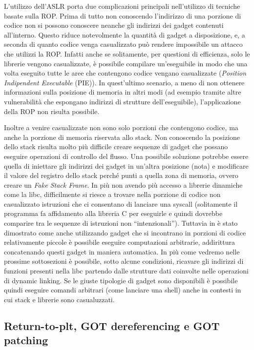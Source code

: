 L'utilizzo dell'ASLR porta due complicazioni principali nell'utilizzo
di tecniche basate sulla ROP. Prima di tutto non conoscendo
l'indirizzo di una porzione di codice non si possono conoscere neanche
gli indirizzi dei gadget contenuti all'interno. Questo riduce
notevolmente la quantità di gadget a disposizione, e, a seconda di
quanto codice venga casualizzato può rendere impossibile un attacco
che utilizzi la ROP. Infatti anche se solitamente, per questioni di
efficienza, solo le librerie vengono casualizzate, è possibile
compilare un'eseguibile in modo che una volta eseguito tutte le aree
che contengono codice vengano casualizzate (\emph{Position Indipendent
  Executable} (PIE)). In quest'ultimo scenario, a meno di non ottenere
informazioni sulla posizione di memoria in altri modi (ad esempio
tramite altre vulnerabilità che espongano indirizzi di strutture
dell'eseguibile), l'applicazione della ROP non risulta possibile.

Inoltre a venire casualizzate non sono solo porzioni che contengono
codice, ma anche la porzione di memoria riservata allo stack. Non
conoscendo la posizione dello stack risulta molto più difficile creare
sequenze di gadget che possano eseguire operazioni di controllo del
flusso. Una possibile soluzione potrebbe essere quella di iniettare
gli indirizzi dei gadget in un'altra posizione (nota) e modificare il
valore del registro dello stack perché punti a quella zona di memoria,
ovvero creare un \emph{Fake Stack Frame}. In più non avendo più
accesso a librerie dinamiche come la libc, difficilmente si riesce a
trovare nella porzione di codice non casualizzato istruzioni che ci
consentano di lanciare una syscall (solitamente il programma fa
affidamento alla libreria C per eseguirle e quindi dovrebbe comparire
tra le sequenze di istruzioni non ``intenzionali''). Tuttavia in
\cite{schwartz-2011} è stato dimostrato come anche utilizzando gadget che si
incontrano in porzioni di codice relativamente piccole è possibile
eseguire computazioni arbitrarie, addirittura concatenando questi
gadget in maniera automatica. In più come vedremo nelle prossime
sottosezioni è possibile, sotto alcune condizioni, ricavare gli
indirizzi di funzioni presenti nella libc partendo dalle strutture
dati coinvolte nelle operazioni di dynamic linking. Se le giuste
tipologie di gadget sono disponibili è possibile quindi eseguire
comandi arbitrari (come lanciare una shell) anche in contesti in cui
stack e librerie sono casualuzzati.


\subsection{Return-to-plt, GOT dereferencing e GOT patching}
\label{sec:expl}

